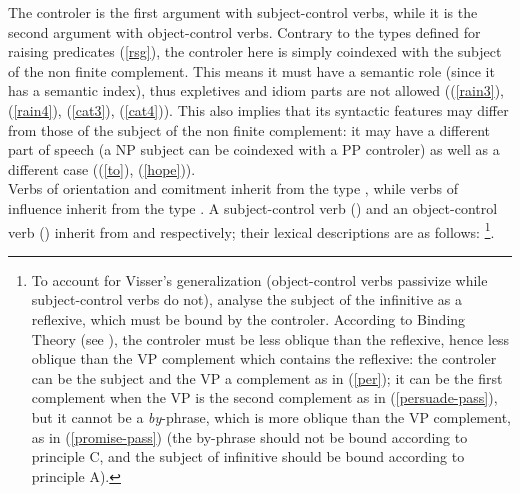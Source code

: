 \documentclass[output=paper
	        ,collection
	        ,collectionchapter
 	        ,biblatex
                ,babelshorthands
                ,newtxmath
                ,draftmode
                ,colorlinks, citecolor=brown
]{./langsci/langscibook}
\begin{document}
The controler is the first argument with subject-control verbs, while it is the second argument with object-control verbs. Contrary to the types defined for raising predicates (\ref{rsg}), the controler here is simply coindexed with the subject of the non finite complement. This means it must have a semantic role (since it has a semantic index), thus expletives and idiom parts are not allowed ((\ref{rain3}), (\ref{rain4}), (\ref{cat3}), (\ref{cat4})). This also implies that its syntactic features may differ from those of the subject of the non finite complement: it may have a different part of speech (a NP subject can be coindexed with a PP controler) as well as a different case ((\ref{to}), (\ref{hope})).\\
Verbs of orientation and comitment inherit from the type , while verbs of influence inherit from the type .
A subject-control verb () and an object-control verb () inherit from  and  respectively; their lexical descriptions are as follows:
\footnote{To account for Visser's generalization (object-control verbs passivize  while subject-control verbs do not), \citet{SagandPollard1991} analyse the subject of the infinitive as a reflexive, which must be bound by the controler. According to Binding Theory (see ), the controler must be less oblique than the reflexive, hence less oblique than the VP complement which contains the reflexive: the controler can be the subject and the VP a complement as in (\ref{per}); it can be the first complement when the VP is the second complement as in (\ref{persuade-pass}), but it cannot be a  \emph{by}-phrase, which is more oblique than the VP complement, as in (\ref{promise-pass}) (the by-phrase should not be bound according to principle C, and the subject of infinitive should be bound according to principle A).}.
\end{document}
